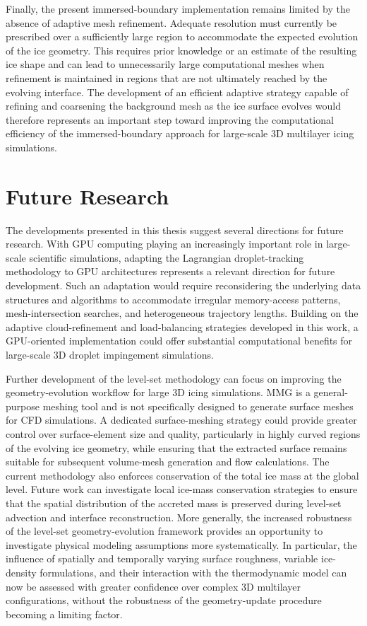 Finally, the present immersed-boundary implementation remains limited by the absence of adaptive mesh refinement. Adequate resolution must currently be prescribed over a sufficiently large region to accommodate the expected evolution of the ice geometry. This requires prior knowledge or an estimate of the resulting ice shape and can lead to unnecessarily large computational meshes when refinement is maintained in regions that are not ultimately reached by the evolving interface. The development of an efficient adaptive strategy capable of refining and coarsening the background mesh as the ice surface evolves would therefore represents an important step toward improving the computational efficiency of the immersed-boundary approach for large-scale 3D multilayer icing simulations.

\section{Future Research}

The developments presented in this thesis suggest several directions for future research. With GPU computing playing an increasingly important role in large-scale scientific simulations, adapting the Lagrangian droplet-tracking methodology to GPU architectures represents a relevant direction for future development. Such an adaptation would require reconsidering the underlying data structures and algorithms to accommodate irregular memory-access patterns, mesh-intersection searches, and heterogeneous trajectory lengths. Building on the adaptive cloud-refinement and load-balancing strategies developed in this work, a GPU-oriented implementation could offer substantial computational benefits for large-scale 3D droplet impingement simulations.

Further development of the level-set methodology can focus on improving the geometry-evolution workflow for large 3D icing simulations. MMG is a general-purpose meshing tool and is not specifically designed to generate surface meshes for CFD simulations. A dedicated surface-meshing strategy could provide greater control over surface-element size and quality, particularly in highly curved regions of the evolving ice geometry, while ensuring that the extracted surface remains suitable for subsequent volume-mesh generation and flow calculations. The current methodology also enforces conservation of the total ice mass at the global level. Future work can investigate local ice-mass conservation strategies to ensure that the spatial distribution of the accreted mass is preserved during level-set advection and interface reconstruction. More generally, the increased robustness of the level-set geometry-evolution framework provides an opportunity to investigate physical modeling assumptions more systematically. In particular, the influence of spatially and temporally varying surface roughness, variable ice-density formulations, and their interaction with the thermodynamic model can now be assessed with greater confidence over complex 3D multilayer configurations, without the robustness of the geometry-update procedure becoming a limiting factor.

